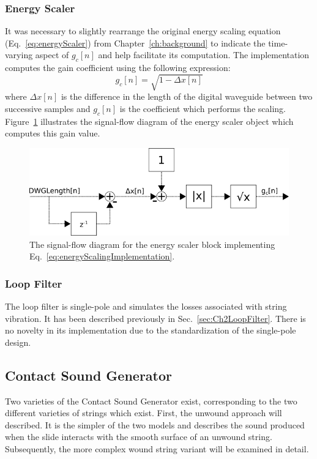 \documentclass[../main.tex]{subfiles}
\begin{document}
\subsubsection{Energy Scaler}
\label{subsec:Ch3EnergyScaler}
It was necessary to slightly rearrange the original energy scaling equation (Eq.~\ref{eq:energyScaler}) from Chapter~\ref{ch:background} to indicate the time-varying aspect of $g_c[n]$ and help facilitate its computation. The implementation computes the gain coefficient using the following expression:
\begin{equation}
    \label{eq:energyScalingImplementation}
    g_c[n] = \sqrt{1-\Delta x[n]}
\end{equation}
where $\Delta x[n]$ is the difference in the length of the digital waveguide between two successive samples and $g_c[n]$ is the coefficient which performs the scaling. Figure~\ref{fig:energyScaler} illustrates the signal-flow diagram of the energy scaler object which computes this gain value.
\begin{figure}[h]
    \centering
    \includegraphics[scale=.5]{./images/diagrams/energyScaler.png}
    \caption{The signal-flow diagram for the energy scaler block implementing Eq.~\ref{eq:energyScalingImplementation}.}
    \label{fig:energyScaler}
\end{figure}

\subsubsection{Loop Filter}
The loop filter is single-pole and simulates the losses associated with string vibration. It has been described previously in Sec.~\ref{sec:Ch2LoopFilter}. There is no novelty in its implementation due to the standardization of the single-pole design.

\subsection{Contact Sound Generator}
Two varieties of the Contact Sound Generator exist, corresponding to the two different varieties of strings which exist. First, the unwound approach will described. It is the simpler of the two models and describes the sound produced when the slide interacts with the smooth surface of an unwound string. Subsequently, the more complex wound string variant will be examined in detail.
\end{document}
